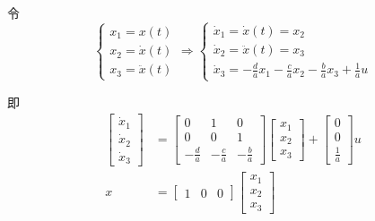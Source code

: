 \begin{exercise} %
    令
    \begin{equation*}
        \begin{cases}
            x_1 = x(t) \\ 
            x_2 = \dot{x}(t) \\
            x_3 = \ddot{x}(t)
        \end{cases} \Rightarrow \begin{cases}
            \dot{x}_1 = \dot{x}(t) = x_2 \\
            \dot{x}_2 = \ddot{x}(t) = x_3 \\
            \dot{x}_3 = -\frac{d}{a}x_1 - \frac{c}{a}x_2 - \frac{b}{a}x_3 + \frac{1}{a}u
        \end{cases}
    \end{equation*}

    即
    \begin{align*}
        \begin{bmatrix}
            \dot{x}_1 \\
            \dot{x}_2 \\
            \dot{x}_3
        \end{bmatrix} &= \begin{bmatrix}
            0 & 1 & 0 \\
            0 & 0 & 1 \\
            -\frac{d}{a} & -\frac{c}{a} & -\frac{b}{a}
        \end{bmatrix} \begin{bmatrix}
            x_1 \\
            x_2 \\
            x_3
        \end{bmatrix} + \begin{bmatrix}
            0 \\
            0 \\
            \frac{1}{a}
        \end{bmatrix} u \\
        x &= \begin{bmatrix}
                1 & 0 & 0
        \end{bmatrix} \begin{bmatrix}
            x_1 \\
            x_2 \\
            x_3
        \end{bmatrix}
\end{align*}
\end{exercise}

